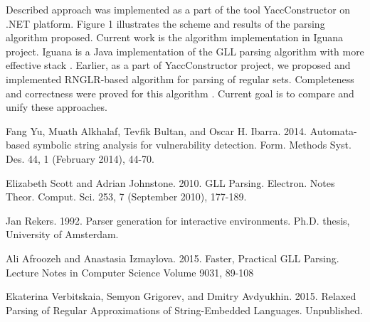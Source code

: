 \documentclass{sig-alternate} %
\begin{document}
Described approach was implemented as a part of the tool YaccConstructor on .NET platform. Figure 1 illustrates the
scheme and results of the parsing algorithm proposed. Current work is the algorithm implementation in Iguana project.
Iguana is a Java implementation of the GLL parsing algorithm with more effective stack \cite{GLL2}. Earlier, as a part of
YaccConstructor project, we proposed and implemented RNGLR-based algorithm for parsing of regular sets. Completeness and
correctness were proved for this algorithm \cite{RNGLR}. Current goal is to compare and unify these approaches.


\begin{thebibliography}{9}
 Fang Yu, Muath Alkhalaf, Tevfik Bultan, and Oscar H. Ibarra. 2014. Automata-based symbolic string analysis for vulnerability detection. Form. Methods Syst. Des. 44, 1 (February 2014), 44-70. 

 Elizabeth Scott and Adrian Johnstone. 2010. GLL Parsing. Electron. Notes Theor. Comput. Sci. 253, 7 (September 2010), 177-189.

 Jan Rekers. 1992. Parser generation for interactive environments. Ph.D. thesis, University of Amsterdam.

 Ali Afroozeh and Anastasia Izmaylova. 2015. Faster, Practical GLL Parsing. Lecture Notes in Computer Science Volume 9031, 89-108

 Ekaterina Verbitskaia, Semyon Grigorev, and Dmitry Avdyukhin. 2015. Relaxed Parsing of Regular Approximations of String-Embedded Languages. Unpublished.

\end{thebibliography}
\end{document}
